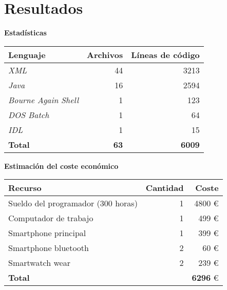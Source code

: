 \section{Resultados}

\begin{slide}
  \begin{block}{\textbf{Estadísticas}}
    \begin{table}[h]
    \centering
    \begin{tabular}{|l|r|r|}
      \hline
      \textbf{Lenguaje} & \textbf{Archivos} & \textbf{Líneas de código} \\
      \hline
      \emph{XML}                &          44  &          3213  \\
      \hline
      \emph{Java}               &          16  &          2594  \\
      \hline
      \emph{Bourne Again Shell} &           1  &           123  \\
      \hline
      \emph{DOS Batch}          &           1  &            64  \\
      \hline
      \emph{IDL}                &           1  &            15  \\
      \hline
      \textbf{Total}            &  \textbf{63} &  \textbf{6009} \\
      \hline
    \end{tabular}
    \end{table} 
  \end{block}
\end{slide}

\begin{slide}
  \begin{block}{\textbf{Estimación del coste económico}}
    \begin{table}[h]
    \centering
    \begin{tabular}{|l|r|r|}
      \hline
      \textbf{Recurso} & \textbf{Cantidad} & \textbf{Coste} \\
      \hline
      Sueldo del programador (300 horas)     & 1 &          4800 \euro \\
      \hline
      Computador de trabajo                  & 1 &           499 \euro \\
      \hline
      Smartphone principal                   & 1 &           399 \euro \\
      \hline
      Smartphone bluetooth                   & 2 &            60 \euro \\
      \hline
      Smartwatch wear                        & 2 &           239 \euro \\
      \hline
      \textbf{Total}                         &   & \textbf{6296} \euro \\
      \hline
    \end{tabular}
    \end{table} 
  \end{block}
\end{slide}

